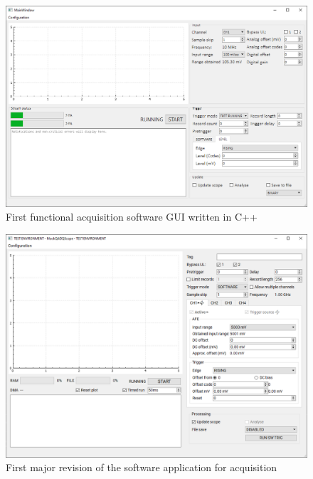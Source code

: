 \begin{figure}[H]
  \centering
  \includegraphics[width=\linewidth]{media/qtadqscope_v1.png}
  \caption{First functional acquisition software GUI written in C++}
  \label{fig:qtadqscope_v1} 
\end{figure}
\begin{figure}[H]
  \centering
  \includegraphics[width=\linewidth]{media/qtadqscope_v2.png}
  \caption{First major revision of the software application for acquisition}
  \label{fig:qtadqscope_v2} 
\end{figure}

